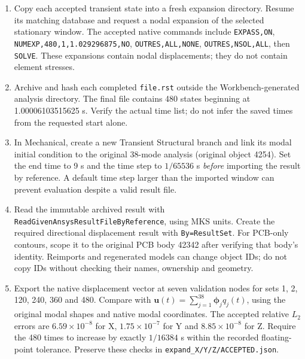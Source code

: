 \begin{enumerate}
\item Copy each accepted transient state into a fresh expansion directory. Resume its matching database and request a nodal expansion of the selected stationary window. The accepted native commands include \texttt{EXPASS,ON}, \texttt{NUMEXP,480,1,1.029296875,NO}, \texttt{OUTRES,ALL,NONE}, \texttt{OUTRES,NSOL,ALL}, then \texttt{SOLVE}. These expansions contain nodal displacements; they do not contain element stresses.
\item Archive and hash each completed \texttt{file.rst} outside the Workbench-generated analysis directory. The final file contains 480 states beginning at 1.00006103515625 s. Verify the actual time list; do not infer the saved times from the requested start alone.
\item In Mechanical, create a new Transient Structural branch and link its modal initial condition to the original 38-mode analysis (original object 4254). Set the end time to 9 s and the time step to $1/65536$ s \emph{before} importing the result by reference. A default time step larger than the imported window can prevent evaluation despite a valid result file.
\item Read the immutable archived result with \texttt{ReadGivenAnsysResultFileByReference}, using MKS units. Create the required directional displacement result with \texttt{By=ResultSet}. For PCB-only contours, scope it to the original PCB body 42342 after verifying that body's identity. Reimports and regenerated models can change object IDs; do not copy IDs without checking their names, ownership and geometry.
\item Export the native displacement vector at seven validation nodes for sets 1, 2, 120, 240, 360 and 480. Compare with $\mathbf{u}(t)=\sum_{j=1}^{38}\boldsymbol{\phi}_j q_j(t)$, using the original modal shapes and native modal coordinates. The accepted relative $L_2$ errors are $6.59\times10^{-8}$ for X, $1.75\times10^{-7}$ for Y and $8.85\times10^{-8}$ for Z. Require the 480 times to increase by exactly $1/16384$ s within the recorded floating-point tolerance. Preserve these checks in \texttt{expand\_X/Y/Z/ACCEPTED.json}.
\end{enumerate}

